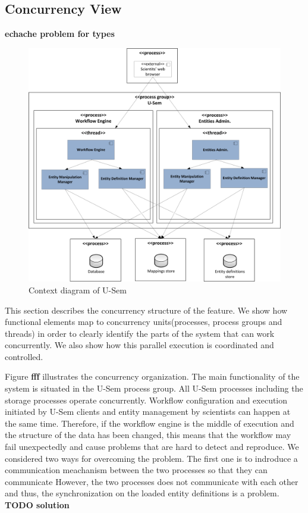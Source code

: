 \documentclass[a4paper, notitlepage]{article}
\begin{document}
\subsection{Concurrency View}
\textbf{echache problem for types}

\begin{figure}[h!]
  \centering
  	\includegraphics[scale=0.5]{functional/concur.png}
  \caption{Context diagram of U-Sem }
  \label{fig_context}
\end{figure}

This section describes the concurrency structure of the feature. We show how functional elements map to concurrency units(processes, process groups and threads) in order to clearly identify the parts of the system that can work concurrently. We also show how this parallel execution is coordinated and controlled.

Figure \textbf{fff} illustrates the concurrency organization. The main functionality of the system is situated in the U-Sem process group. All U-Sem processes including the storage processes operate concurrently. Workflow configuration and execution initiated by U-Sem clients and entity management by scientists can happen at the same time. Therefore, if the workflow engine is the middle of execution and the structure of the data has been changed, this means that the workflow may fail unexpectedly and cause problems that are hard to detect and reproduce. We considered two ways for overcoming the problem. The first one is to indroduce a communication meachanism between the two processes so that they can communicate  However, the two processes does not communicate with each other and thus, the synchronization on the loaded entity definitions is a problem. \textbf{TODO solution}
\end{document}
